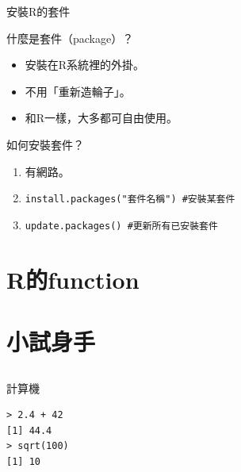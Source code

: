 \documentclass[12pt]{beamer}
\begin{document}
\begin{frame}[fragile]{安裝R的套件}
\begin{block}{什麼是套件（package）？}
\begin{itemize}
\item 安裝在R系統裡的外掛。
\item 不用「重新造輪子」。
\item 和R一樣，大多都可自由使用。
\end{itemize}
\end{block}

\begin{block}{如何安裝套件？}
\begin{enumerate}
\item 有網路。
\item \verb+install.packages("套件名稱") #安裝某套件+
\item \verb+update.packages() #更新所有已安裝套件+
\end{enumerate}
\end{block}
\end{frame}

\section{R的function}\subsection{}


\section{小試身手}\subsection{}

\begin{frame}[fragile]{計算機}
\begin{verbatim}
> 2.4 + 42
[1] 44.4
> sqrt(100)
[1] 10
\end{verbatim}
\end{frame}
\end{document}
